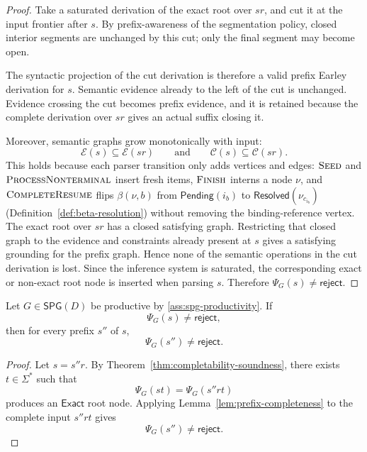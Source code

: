 \begin{proof}
Take a saturated derivation of the exact root over $sr$, and cut it at the input frontier after $s$. By prefix-awareness of the segmentation policy, closed interior segments are unchanged by this cut; only the final segment may become open.

The syntactic projection of the cut derivation is therefore a valid prefix Earley derivation for $s$. Semantic evidence already to the left of the cut is unchanged. Evidence crossing the cut becomes prefix evidence, and it is retained because the complete derivation over $sr$ gives an actual suffix closing it.

Moreover, semantic graphs grow monotonically with input:
\[
  \mathcal E(s) \subseteq \mathcal E(sr)
  \qquad\text{and}\qquad
  \mathcal C(s) \subseteq \mathcal C(sr).
\]
This holds because each parser transition only adds vertices and edges: $\textsc{Seed}$ and $\textsc{ProcessNonterminal}$ insert fresh items, $\textsc{Finish}$ interns a node $\nu$, and $\textsc{CompleteResume}$ flips $\beta(\nu,b)$ from $\mathsf{Pending}(i_b)$ to $\mathsf{Resolved}(\nu_{c_{i_b}})$ (Definition~\ref{def:beta-resolution}) without removing the binding-reference vertex. The exact root over $sr$ has a closed satisfying graph. Restricting that closed graph to the evidence and constraints already present at $s$ gives a satisfying grounding for the prefix graph. Hence none of the semantic operations in the cut derivation is lost. 
Since the inference system is saturated, the corresponding exact or non-exact root node is inserted when parsing $s$. Therefore $\Psi_G(s) \neq \mathsf{reject}$.
\end{proof}

\begin{theorem}
\label{thm:prefix-monotonicity}
Let $G \in \mathsf{SPG}(D)$ be productive by \ref{ass:spg-productivity}. If
\[
  \Psi_G(s) \neq \mathsf{reject},
\]
then for every prefix $s''$ of $s$,
\[
  \Psi_G(s'') \neq \mathsf{reject}.
\]
\end{theorem}

\begin{proof}
Let $s=s''r$. By Theorem~\ref{thm:completability-soundness}, there exists $t \in \Sigma^\ast$ such that
\[
  \Psi_G(st)=\Psi_G(s''rt)
\]
produces an $\mathsf{Exact}$ root node. Applying Lemma~\ref{lem:prefix-completeness} to the complete input $s''rt$ gives
\[
  \Psi_G(s'') \neq \mathsf{reject}.
\]
\end{proof}
